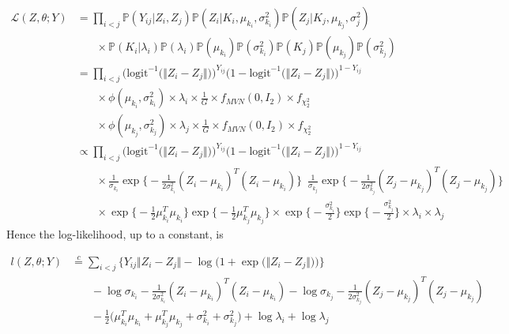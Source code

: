 \documentclass{article}
\begin{document}
\begin{align*}
\mathcal{L}(Z, \theta; Y) &= \prod_{i<j}\mathbb{P}(Y_{ij} | Z_i, Z_j) \mathbb{P}(Z_i | K_i, \mu_{k_i}, \sigma_{k_i}^2) \mathbb{P}(Z_j | K_j, \mu_{k_j}, \sigma_j^2) \\ 
&\ \ \ \ \ \ \ \ \times  \mathbb{P}(K_i | \lambda_i) \mathbb{P}(\lambda_i)\mathbb{P}(\mu_{k_i})\mathbb{P}(\sigma_{k_i}^2)\mathbb{P}(K_j)\mathbb{P}(\mu_{k_j})\mathbb{P}(\sigma_{k_j}^2) \\
&= \prod_{i<j}\Big(\text{logit}^{-1}\big(\Vert Z_i-Z_j\Vert)\Big)^{Y_{ij}}\Big(1 - \text{logit}^{-1}\big(\Vert Z_i-Z_j\Vert)\Big)^{1 - Y_{ij}} \\
&\ \ \ \ \ \ \ \ \times \phi(\mu_{k_i}, \sigma_{k_i}^2)\times \lambda_i \times \frac{1}{G} \times f_{MVN}(0, I_2) \times f_{\chi^2_2} \\
&\ \ \ \ \ \ \ \ \times \phi(\mu_{k_j}, \sigma_{k_j}^2)\times  \lambda_j \times \frac{1}{G} \times f_{MVN}(0, I_2) \times f_{\chi^2_2} \\
&\propto \prod_{i<j}\Big(\text{logit}^{-1}\big(\Vert Z_i-Z_j\Vert)\Big)^{Y_{ij}}\Big(1 - \text{logit}^{-1}\big(\Vert Z_i-Z_j\Vert)\Big)^{1 - Y_{ij}} \\
&\ \ \ \ \ \ \ \ \times \frac{1}{\sigma_{k_i}}\exp\Big\{-\frac{1}{2\sigma_{k_i}^2}(Z_i - \mu_{k_i})^T( Z_i - \mu_{k_i}) \Big\} \enspace \frac{1}{\sigma_{k_j}}\exp\Big\{-\frac{1}{2\sigma_{k_j}^2}(Z_j - \mu_{k_j})^T (Z_j - \mu_{k_j})\Big\} \\
&\ \ \ \ \ \ \ \ \times \exp\Big\{-\frac{1}{2}\mu_{k_i}^T\mu_{k_i}\Big\}\exp\Big\{-\frac{1}{2}\mu_{k_j}^T\mu_{k_j}\Big\}  \times \exp\Big\{-\frac{\sigma_{k_i}^2}{2}\Big\}\exp\Big\{-\frac{\sigma_{k_j}^2}{2}\Big\} \times \lambda_i \times \lambda_j
\end{align*}
Hence the log-likelihood, up to a constant, is

\begin{align*}
l(Z, \theta ; Y) &\overset{c}= \sum_{i<j} \Big\{Y_{ij} \Vert Z_i - Z_j \Vert - \log \big(1 + \exp\big(\Vert Z_i - Z_j\Vert\big)\big)\Big\} \\
&\ \ \ \ \ \ \ \ - \log \sigma_{k_i} - \frac{1}{2\sigma_{k_i}^2}(Z_i - \mu_{k_i})^T( Z_i - \mu_{k_i}) - \log \sigma_{k_j} - \frac{1}{2\sigma_{k_j}^2}(Z_j - \mu_{k_j})^T (Z_j - \mu_{k_j})  \\
&\ \ \ \ \ \ \ \ -\frac{1}{2}\Big(\mu_{k_i}^T\mu_{k_i} + \mu_{k_j}^T\mu_{k_j} + \sigma_{k_i}^2 + \sigma_{k_j}^2\Big)  + \log \lambda_i + \log \lambda_j
\end{align*}
\end{document}
